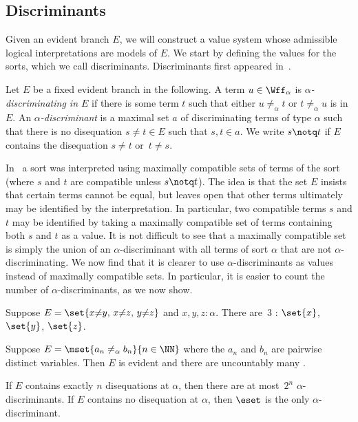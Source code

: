 \subsection{Discriminants}

Given an evident branch $E$, we will construct a value
system whose admissible logical interpretations are
models of $E$.  We start by defining the values for the
sorts, which we call discriminants.
Discriminants first appeared in~\cite{BrownSmolkaBasic}.

Let $E$ be a fixed evident branch in the following. 
A term $u\in\Wff_\alpha$ is \emph{$\alpha$-discriminating in $E$}
if there
is some term $t$ such that either $u\neq_\alpha t$ or
$t\neq_\alpha u$ is in $E$.
An \emph{$\alpha$-discriminant} is a maximal set $a$ of
discriminating terms of type $\alpha$ such that there
is no disequation $s{\neq}t\in E$ such that $s,t\in a$.
We write \emph{$s\notq t$} if $E$ contains the
disequation $s{\neq }t$ or~$t{\neq}s$.

In~\cite{Brown2004a} a sort was interpreted using
maximally compatible sets of terms of the sort (where $s$ and $t$
are compatible unless $s\notq t$).
The idea is that the set $E$ insists that certain terms cannot be
equal, but leaves open that other terms ultimately may be identified
by the interpretation.  In particular, two compatible terms $s$ and $t$ may be identified by
taking a maximally compatible set of terms containing both $s$ and $t$ as a value.
It is not difficult to see that a maximally compatible set is simply the union of an $\alpha$-discriminant
with all terms of sort $\alpha$ that are not $\alpha$-discriminating.
We now find that it is clearer to use $\alpha$-discriminants as values instead of maximally compatible sets.
In particular, it is easier to count the number of $\alpha$-discriminants, as we now show.


\begin{exa}
  Suppose $E=\set{x{\neq}y,\,x{\neq}z,\,y{\neq}z}$ and
  $x,y,z:\alpha$.  There are~3
  : $\set{x}$, $\set{y}$,
  $\set{z}$.
\end{exa}


\begin{exa}
  Suppose $E=\mset{a_n\neq_\alpha b_n}{n\in\NN}$ where
  the $a_n$ and $b_n$ are pairwise distinct variables.
  Then $E$ is evident and there are uncountably many
  .
\end{exa}

\begin{prop}
  \label{prop-finite-discs}
  If $E$ contains exactly $n$ disequations at $\alpha$,
  then there are at most~$2^n$ $\alpha$-discriminants.
  If $E$ contains no disequation at $\alpha$, then
  $\eset$ is the only $\alpha$-discriminant.
\end{prop}

